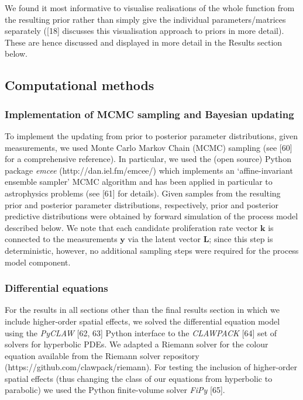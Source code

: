 \documentclass[10pt,letterpaper]{article}
\begin{document}
We found it most informative to visualise realisations of the whole
function from the resulting prior rather than simply give the individual
parameters/matrices separately ({[}18{]} discusses this visualisation
approach to priors in more detail). These are hence discussed and
displayed in more detail in the Results section below.

\subsection{Computational methods}\label{computational-methods}

\subsubsection{Implementation of MCMC sampling and Bayesian
updating}\label{implementation-of-mcmc-sampling-and-bayesian-updating}

To implement the updating from prior to posterior parameter
distributions, given measurements, we used Monte Carlo Markov Chain
(MCMC) sampling (see {[}60{]} for a comprehensive reference). In
particular, we used the (open source) Python package \emph{emcee}
(http://dan.iel.fm/emcee/) which implements an `affine-invariant
ensemble sampler' MCMC algorithm and has been applied in particular to
astrophysics problems (see {[}61{]} for details). Given samples from the
resulting prior and posterior parameter distributions, respectively,
prior and posterior predictive distributions were obtained by forward
simulation of the process model described below. We note that each
candidate proliferation rate vector \(\mathbf{k}\) is connected to the
measurements \(\mathbf{y}\) via the latent vector \(\mathbf{L}\); since
this step is deterministic, however, no additional sampling steps were
required for the process model component.

\subsubsection{Differential equations}\label{differential-equations}

For the results in all sections other than the final results section in
which we include higher-order spatial effects, we solved the
differential equation model using the \emph{PyCLAW} {[}62, 63{]} Python
interface to the \emph{CLAWPACK} {[}64{]} set of solvers for hyperbolic
PDEs. We adapted a Riemann solver for the colour equation available from
the Riemann solver repository (https://github.com/clawpack/riemann). For
testing the inclusion of higher-order spatial effects (thus changing the
class of our equations from hyperbolic to parabolic) we used the Python
finite-volume solver \emph{FiPy} {[}65{]}.
\end{document}
